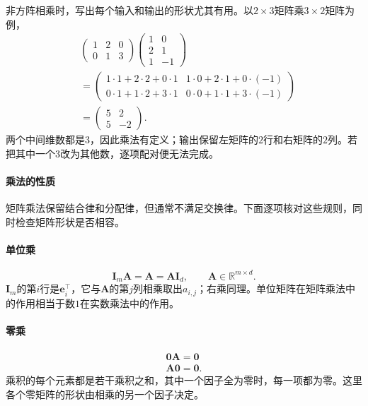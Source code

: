 非方阵相乘时，写出每个输入和输出的形状尤其有用。以$2\times3$矩阵乘$3\times2$矩阵为例，
\[
 \begin{aligned}
 &\begin{pmatrix}1&2&0\\0&1&3\end{pmatrix}
 \begin{pmatrix}1&0\\2&1\\1&-1\end{pmatrix}\\
 &=\begin{pmatrix}1\cdot1+2\cdot2+0\cdot1&1\cdot0+2\cdot1+0\cdot(-1)\\
 0\cdot1+1\cdot2+3\cdot1&0\cdot0+1\cdot1+3\cdot(-1)\end{pmatrix}\\
 &=\begin{pmatrix}5&2\\5&-2\end{pmatrix}.
 \end{aligned}
\]
两个中间维数都是$3$，因此乘法有定义；输出保留左矩阵的$2$行和右矩阵的$2$列。若把其中一个$3$改为其他数，逐项配对便无法完成。

\paragraph{乘法的性质}
矩阵乘法保留结合律和分配律，但通常不满足交换律。下面逐项核对这些规则，同时检查矩阵形状是否相容。

\paragraph{单位乘}
\[
\bm I_m\bm A=\bm A=\bm A\bm I_d,\qquad
\bm A\in\mathbb R^{m\times d}.
\]
$\bm I_m$的第$i$行是$\bm e_i^\top$，它与$\bm A$的第$j$列相乘取出$a_{i,j}$；右乘同理。单位矩阵在矩阵乘法中的作用相当于数$1$在实数乘法中的作用。

\paragraph{零乘}
\[
 \begin{gathered}
\bm0\bm A=\bm0\\
\bm A\bm0=\bm0.
 \end{gathered}
\]
乘积的每个元素都是若干乘积之和，其中一个因子全为零时，每一项都为零。这里各个零矩阵的形状由相乘的另一个因子决定。

